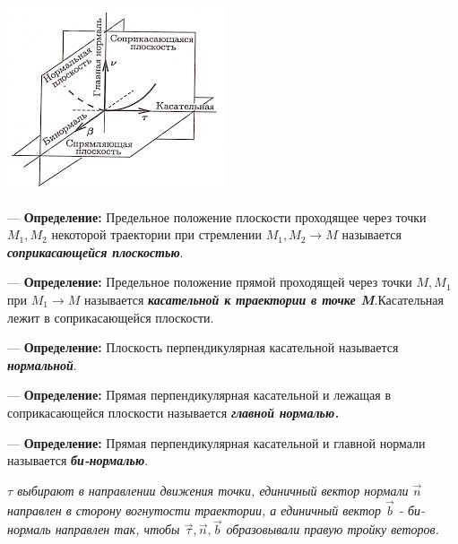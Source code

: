 \documentclass[12pt,a4paper]{report}
\begin{document}
\begin{enumerate}
\begin{enumerate}
\begin{center}
                        \includegraphics[]{images.jpeg}
                    \end{center}
                    \vspace{5px}

                    --- \textbf{Определение:} Предельное положение плоскости проходящее через точки $M_1,M_2$ некоторой траектории при стремлении $M_1,M_2 \to M$ называется \textbf{\textit{соприкасающейся плоскостью}}.

                    \vspace{5px}

                    --- \textbf{Определение:} Предельное положение прямой проходящей через точки $M,M_1$ при $M_1 \to M$ называется \textbf{\textit{касательной к траектории в точке M}}.Касательная лежит в соприкасающейся плоскости.

                    \vspace{5px}

                    --- \textbf{Определение:} Плоскость перпендикулярная касательной называется \textbf{\textit{нормальной}}.

                    \vspace{5px}

                    --- \textbf{Определение:} Прямая перпендикулярная касательной и лежащая в соприкасающейся плоскости называется \textbf{\textit{главной нормалью.}}

                    \vspace{5px}

                    --- \textbf{Определение:} Прямая перпендикулярная касательной и главной нормали называется \textbf{\textit{би-нормалью}}.

                    \vspace{5px}

                    \textit{$\tau$ выбирают в направлении движения точки, единичный вектор нормали $\vec n$ направлен в сторону вогнутости траектории, а единичный вектор $\vec b$ - би-нормаль направлен так, чтобы $\vec \tau, \vec n, \vec b$ образовывали правую тройку веторов.}


\end{enumerate}
\end{enumerate}
\end{document}

